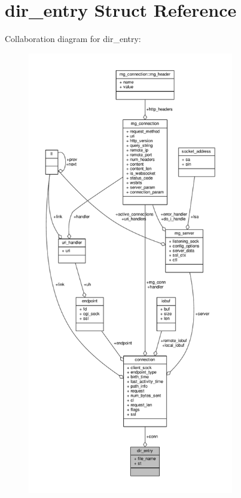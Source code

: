 \hypertarget{structdir__entry}{}\section{dir\+\_\+entry Struct Reference}
\label{structdir__entry}


Collaboration diagram for dir\+\_\+entry\+:
\nopagebreak
\begin{figure}[H]
\begin{center}
\leavevmode
\includegraphics[height=550pt]{d3/d2a/structdir__entry__coll__graph}
\end{center}
\end{figure}
